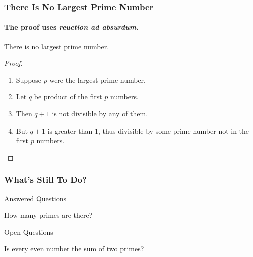 \begin{frame}
  \frametitle{There Is No Largest Prime Number}
  \framesubtitle{The proof uses \textit{reuction ad absurdum}.}

  \begin{theorem}

    There is no largest prime number.

  \end{theorem}



  \begin{proof}

    \begin{enumerate}

    \item<1-> Suppose $p$ were the largest prime number.

    \item<2-> Let $q$ be product of the first $p$ numbers.

    \item<3-> Then $q + 1$ is not divisible by any of them.

    \item<1-> But $q + 1$ is greater than $1$, thus divisible by some prime
      number not in the first $p$ numbers. \qedhere

    \end{enumerate}

  \end{proof}


\end{frame}





\begin{frame}
  \frametitle{What's Still To Do?}


  \begin{block}{Answered Questions}

    How many primes are there?

  \end{block}



  \begin{block}{Open Questions}

    Is every even number the sum of two primes?

  \end{block}

\end{frame}






